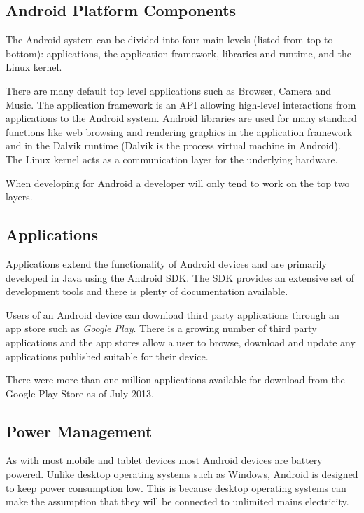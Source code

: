 \documentclass[draft]{report}
\begin{document}
\subsection{Android Platform Components}

The Android system can be divided into four main levels (listed from top to bottom): applications, the application framework, libraries and runtime, and the Linux kernel.

There are many default top level applications such as Browser, Camera and Music. The application framework is an API allowing high-level interactions from applications to the Android system. Android libraries are used for many standard functions like web browsing and rendering graphics in the application framework and in the Dalvik runtime (Dalvik is the process virtual machine in Android). The Linux kernel acts as a communication layer for the underlying hardware.

When developing for Android a developer will only tend to work on the top two layers.

\subsection{Applications}

Applications extend the functionality of Android devices and are primarily developed in Java using the Android SDK. The SDK provides an extensive set of development tools and there is plenty of documentation available.

Users of an Android device can download third party applications through an app store such as \emph{Google Play}. There is a growing number of third party applications and the app stores allow a user to browse, download and update any applications published suitable for their device.

There were more than one million applications available for download from the Google Play Store as of July 2013\cite{appstoredownloads}. 

\subsection{Power Management}

As with most mobile and tablet devices most Android devices are battery powered. Unlike desktop operating systems such as Windows, Android is designed to keep power consumption low. This is because desktop operating systems can make the assumption that they will be connected to unlimited mains electricity. 
\end{document}
